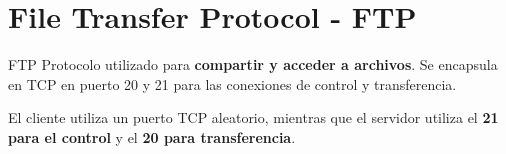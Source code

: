 \section{File Transfer Protocol - FTP}

\begin{definicion}{FTP}
    Protocolo utilizado para \textbf{compartir y acceder a archivos}. Se encapsula en TCP en puerto 20 y 21 para las conexiones de control y transferencia. 
\end{definicion}

El cliente utiliza un puerto TCP aleatorio, mientras que el servidor utiliza el \textbf{21 para el control} y el \textbf{20 para transferencia}. 